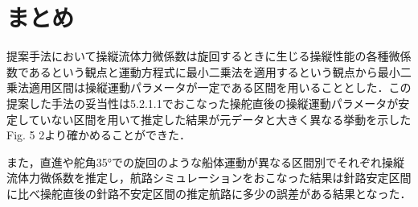\section{まとめ}
提案手法において操縦流体力微係数は旋回するときに生じる操縦性能の各種微係数であるという観点と運動方程式に最小二乗法を適用するという観点から最小二乗法適用区間は操縦運動パラメータが一定である区間を用いることとした．この提案した手法の妥当性は5.2.1.1でおこなった操舵直後の操縦運動パラメータが安定していない区間を用いて推定した結果が元データと大きく異なる挙動を示したFig. 5 2より確かめることができた． 

また，直進や舵角35°での旋回のような船体運動が異なる区間別でそれぞれ操縦流体力微係数を推定し，航路シミュレーションをおこなった結果は針路安定区間に比べ操舵直後の針路不安定区間の推定航路に多少の誤差がある結果となった．